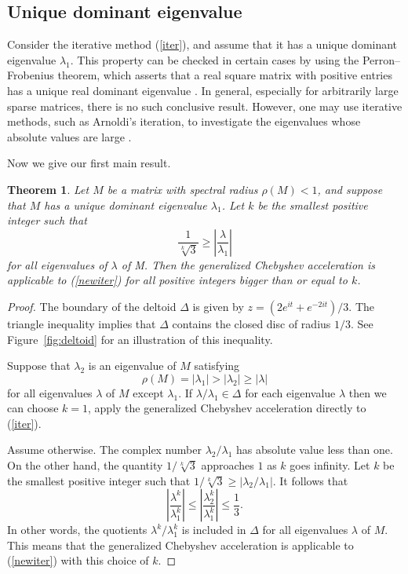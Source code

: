 \documentclass[reqno]{amsart}
\numberwithin{equation}{section}
\theoremstyle{plain}
\newtheorem{theorem}{Theorem}
\theoremstyle{definition}
\begin{document}
\subsection{Unique dominant eigenvalue}
Consider the iterative method (\ref{iter}), and assume that it has a unique dominant eigenvalue $\lambda_1$. This property can be checked in certain cases by using the Perron–Frobenius theorem, which asserts that a real square matrix with positive entries has a unique real dominant eigenvalue \cite{meyer}. In general, especially for arbitrarily large sparse matrices, there is no such conclusive result. However, one may use iterative methods, such as Arnoldi's iteration, to investigate the eigenvalues whose absolute values are large \cite{arnoldi}. 

Now we give our first main result.
\begin{theorem}\label{existingk}
Let $M$ be a matrix with spectral radius $\rho(M)<1$, and suppose that $M$ has a unique dominant eigenvalue $\lambda_1$. Let $k$ be the smallest positive integer such that $$\frac{1}{\sqrt[k]{3}} \geq \left|\frac{\lambda}{\lambda_1}\right|$$ for all eigenvalues of $\lambda$ of M. Then the generalized Chebyshev acceleration is applicable to (\ref{newiter}) for all positive integers bigger than or equal to $k$.
\end{theorem}
\begin{proof}
The boundary of the deltoid $\Delta$ is given by $z=(2e^{it}+e^{-2it})/3$. The triangle inequality implies that $\Delta$ contains the closed disc of radius $1/3$. See Figure~\ref{fig:deltoid} for an illustration of this inequality. 

Suppose that $\lambda_2$  is an eigenvalue of $M$ satisfying
\[\rho(M) = |\lambda_1| > |\lambda_2| \geq |\lambda|	\]
for all eigenvalues $\lambda$ of $M$ except $\lambda_1$. If $\lambda/\lambda_1 \in \Delta$ for each eigenvalue $\lambda$ then we can choose $k=1$, apply the generalized Chebyshev acceleration directly to (\ref{iter}).

Assume otherwise. The complex number $\lambda_2/\lambda_1$ has absolute value less than one. On the other hand, the quantity $1/\sqrt[k]{3}$ approaches $1$ as $k$ goes infinity. Let $k$ be the smallest positive integer such that  $1/\sqrt[k]{3} \geq |\lambda_2/\lambda_1|$. It follows that  
$$ \left|\frac{\lambda^k}{\lambda_1^k}\right| \leq \left|\frac{\lambda_2^k}{\lambda_1^k}\right| \leq \frac{1}{3}.$$
In other words, the quotients $\lambda^k/\lambda_1^k$ is included in $\Delta$ for all eigenvalues $\lambda$ of $M$. This means that the generalized Chebyshev acceleration is applicable to (\ref{newiter}) with this choice of $k$.
\end{proof}
\end{document}
